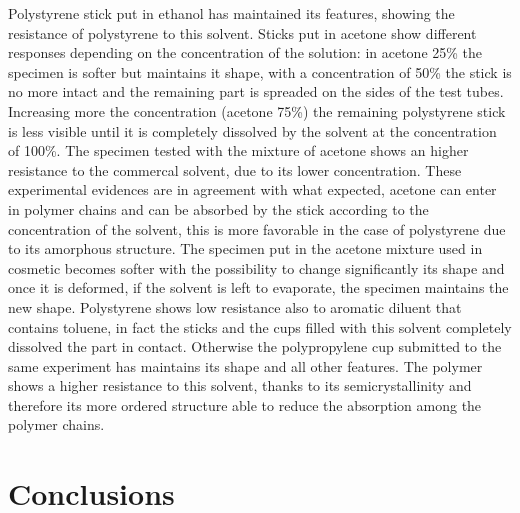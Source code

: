 \documentclass[a4paper, 11pt]{article}
\begin{document}
Polystyrene stick put in ethanol has maintained its features, showing the resistance of polystyrene to this solvent. Sticks put in acetone show different responses depending on the concentration of the solution: in acetone 25\% the specimen is softer but maintains it shape, with a concentration of 50\% the stick is no more intact and the remaining part is spreaded on the sides of the test tubes. Increasing more the concentration (acetone 75\%) the remaining polystyrene stick is less visible until it is completely dissolved by the solvent at the concentration of 100\%. The specimen tested with the mixture of acetone shows an higher resistance to the commercal solvent, due to its lower concentration.
These experimental evidences are in agreement with what expected, acetone can enter in polymer chains and can be absorbed by the stick according to the concentration of the solvent, this is more favorable in the case of polystyrene due to its amorphous structure. The specimen put in the acetone mixture used in cosmetic becomes softer with the possibility to change significantly its shape and once it is deformed, if the solvent is left to evaporate, the specimen maintains the new shape.
Polystyrene shows low resistance also to aromatic diluent that contains toluene, in fact the sticks and the cups filled with this solvent completely dissolved the part in contact. Otherwise the polypropylene cup submitted to the same experiment has maintains its shape and all other features. The polymer shows a higher resistance to this solvent, thanks to its semicrystallinity and therefore its more ordered structure able to reduce the absorption among the polymer chains.

\newpage

\section{Conclusions}
\end{document}

